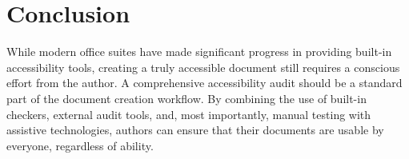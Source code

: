 \section{Conclusion}
\label{sec:office-audit-conclusion}

While modern office suites have made significant progress in providing built-in accessibility tools, creating a truly accessible document still requires a conscious effort from the author. A comprehensive accessibility audit should be a standard part of the document creation workflow. By combining the use of built-in checkers, external audit tools, and, most importantly, manual testing with assistive technologies, authors can ensure that their documents are usable by everyone, regardless of ability.

